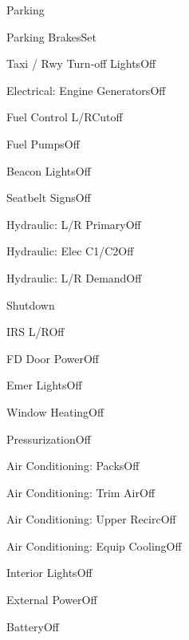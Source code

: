 \documentclass[sim-use, halfpage]{checklist}
\begin{document}
\begin{checklist}{Parking}
  \item{Parking Brakes}{Set}
  \item{Taxi / Rwy Turn-off Lights}{Off}
  \item{Electrical: Engine Generators}{Off}
  \item{Fuel Control L/R}{Cutoff}
  \item{Fuel Pumps}{Off}
  \item{Beacon Lights}{Off}
  \item{Seatbelt Signs}{Off}
  \item{Hydraulic: L/R Primary}{Off}
  \item{Hydraulic: Elec C1/C2}{Off}
  \item{Hydraulic: L/R Demand}{Off}
\end{checklist}

\begin{checklist}{Shutdown}
  \item{IRS L/R}{Off}
  \item{FD Door Power}{Off}
  \item{Emer Lights}{Off}
  \item{Window Heating}{Off}
  \item{Pressurization}{Off}
  \item{Air Conditioning: Packs}{Off}
  \item{Air Conditioning: Trim Air}{Off}
  \item{Air Conditioning: Upper Recirc}{Off}
  \item{Air Conditioning: Equip Cooling}{Off}
  \item{Interior Lights}{Off}
  \item{External Power}{Off}
  \item{Battery}{Off}
\end{checklist}
\end{document}
